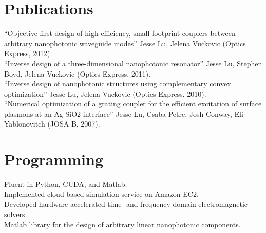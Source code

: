\documentclass{res}
\begin{document}
\begin{resume}
\section{Publications}          
    ``Objective-first design of high-efficiency, small-footprint couplers between arbitrary nanophotonic waveguide modes'' Jesse Lu, Jelena Vuckovic (Optics Express, 2012). \\
    ``Inverse design of a three-dimensional nanophotonic resonator'' Jesse Lu, Stephen Boyd, Jelena Vuckovic (Optics Express, 2011). \\
    ``Inverse design of nanophotonic structures using complementary convex optimization'' Jesse Lu, Jelena Vuckovic (Optics Express, 2010). \\
    ``Numerical optimization of a grating coupler for the efficient excitation of surface plasmons at an Ag-SiO2 interface'' Jesse Lu, Csaba Petre, Josh Conway, Eli Yablonovitch (JOSA B, 2007).
  
\section{Programming}          
    Fluent in Python, CUDA, and Matlab. \\
    Implemented cloud-based simulation service on Amazon EC2. \\
    Developed hardware-accelerated time- and frequency-domain
        electromagnetic solvers. \\
    Matlab library for the design of arbitrary linear nanophotonic components.


\end{resume}
\end{document}
